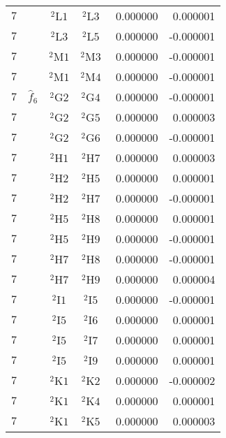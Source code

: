 \begin{longtable}{|c|c|c|c|c|c|}
    $7$ &  & ${}^{2}{\text{L1}}$ & ${}^{2}{\text{L3}}$ & \,\,0.000000 & \,\,0.000001 \\
    $7$ &  & ${}^{2}{\text{L3}}$ & ${}^{2}{\text{L5}}$ & \,\,0.000000 & -0.000001 \\
    $7$ &  & ${}^{2}{\text{M1}}$ & ${}^{2}{\text{M3}}$ & \,\,0.000000 & -0.000001 \\
    $7$ &  & ${}^{2}{\text{M1}}$ & ${}^{2}{\text{M4}}$ & \,\,0.000000 & -0.000001 \\
    $7$ & $\hat{f}_6$ & ${}^{2}{\text{G2}}$ & ${}^{2}{\text{G4}}$ & \,\,0.000000 & -0.000001 \\
    $7$ &  & ${}^{2}{\text{G2}}$ & ${}^{2}{\text{G5}}$ & \,\,0.000000 & \,\,0.000003 \\
    $7$ &  & ${}^{2}{\text{G2}}$ & ${}^{2}{\text{G6}}$ & \,\,0.000000 & -0.000001 \\
    $7$ &  & ${}^{2}{\text{H1}}$ & ${}^{2}{\text{H7}}$ & \,\,0.000000 & \,\,0.000003 \\
    $7$ &  & ${}^{2}{\text{H2}}$ & ${}^{2}{\text{H5}}$ & \,\,0.000000 & \,\,0.000001 \\
    $7$ &  & ${}^{2}{\text{H2}}$ & ${}^{2}{\text{H7}}$ & \,\,0.000000 & -0.000001 \\
    $7$ &  & ${}^{2}{\text{H5}}$ & ${}^{2}{\text{H8}}$ & \,\,0.000000 & \,\,0.000001 \\
    $7$ &  & ${}^{2}{\text{H5}}$ & ${}^{2}{\text{H9}}$ & \,\,0.000000 & -0.000001 \\
    $7$ &  & ${}^{2}{\text{H7}}$ & ${}^{2}{\text{H8}}$ & \,\,0.000000 & -0.000001 \\
    $7$ &  & ${}^{2}{\text{H7}}$ & ${}^{2}{\text{H9}}$ & \,\,0.000000 & \,\,0.000004 \\
    $7$ &  & ${}^{2}{\text{I1}}$ & ${}^{2}{\text{I5}}$ & \,\,0.000000 & -0.000001 \\
    $7$ &  & ${}^{2}{\text{I5}}$ & ${}^{2}{\text{I6}}$ & \,\,0.000000 & \,\,0.000001 \\
    $7$ &  & ${}^{2}{\text{I5}}$ & ${}^{2}{\text{I7}}$ & \,\,0.000000 & \,\,0.000001 \\
    $7$ &  & ${}^{2}{\text{I5}}$ & ${}^{2}{\text{I9}}$ & \,\,0.000000 & \,\,0.000001 \\
    $7$ &  & ${}^{2}{\text{K1}}$ & ${}^{2}{\text{K2}}$ & \,\,0.000000 & -0.000002 \\
    $7$ &  & ${}^{2}{\text{K1}}$ & ${}^{2}{\text{K4}}$ & \,\,0.000000 & \,\,0.000001 \\
    $7$ &  & ${}^{2}{\text{K1}}$ & ${}^{2}{\text{K5}}$ & \,\,0.000000 & \,\,0.000003 \\

\end{longtable}
